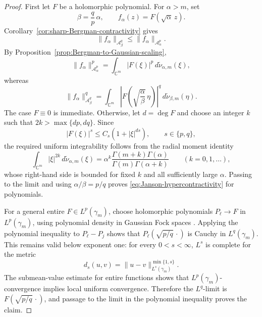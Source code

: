 \documentclass[11pt,reqno]{amsart}
\numberwithin{equation}{section}
\theoremstyle{definition}
\theoremstyle{remark}
\begin{document}
\begin{proof}
First let \(F\) be a holomorphic polynomial.  For \(\alpha>m\), set
\[
 \beta=\frac{q}p\,\alpha,
 \qquad
 f_\alpha(z)=F(\sqrt{\alpha}\,z).
\]
Corollary~\ref{cor:sharp-Bergman-contractivity} gives
\[
 \|f_\alpha\|_{\mathcal A^q_\beta}
 \le
 \|f_\alpha\|_{\mathcal A^p_\alpha}.
\]
By Proposition~\ref{prop:Bergman-to-Gaussian-scaling},
\[
 \|f_\alpha\|_{\mathcal A^p_\alpha}^p
 =
 \int_{\mathbb C^m}|F(\xi)|^p
 \,d\widetilde\nu_{\alpha,m}(\xi),
\]
whereas
\[
 \|f_\alpha\|_{\mathcal A^q_\beta}^q
 =
 \int_{\mathbb C^m}
 \left|F\!\left(\sqrt{\frac{\alpha}{\beta}}\,\eta\right)\right|^q
 \,d\widetilde\nu_{\beta,m}(\eta).
\]
The case \(F\equiv0\) is immediate. Otherwise, let \(d=\deg F\)
and choose an integer \(k\) such that
\(2k>\max\{dp,dq\}\).  Since
\[
 |F(\xi)|^s\le C_s(1+|\xi|^{ds}),
 \qquad s\in\{p,q\},
\]
the required uniform integrability follows from the radial moment identity
\[
 \int_{\mathbb C^m}|\xi|^{2k}\,
 d\widetilde\nu_{\alpha,m}(\xi)
 =
 \alpha^k
 \frac{\Gamma(m+k)\Gamma(\alpha)}{\Gamma(m)\Gamma(\alpha+k)}
 \qquad(k=0,1,\ldots),
\]
whose right-hand side is bounded for fixed \(k\) and all sufficiently large
\(\alpha\).  Passing to the limit and using \(\alpha/\beta=p/q\) proves
\eqref{eq:Janson-hypercontractivity} for polynomials.

For a general entire \(F\in L^p(\gamma_m)\), choose holomorphic polynomials
\(P_\ell\to F\) in \(L^p(\gamma_m)\), using polynomial density in Gaussian
Fock spaces \cite[Chapter~2]{ZhuFock2012}.  Applying the polynomial
inequality to \(P_\ell-P_j\) shows that
\(P_\ell(\sqrt{p/q}\,\cdot)\) is Cauchy in \(L^q(\gamma_m)\).  This remains
valid below exponent one: for every \(0<s<\infty\), \(L^s\) is complete for
the metric
\[
 d_s(u,v)=\|u-v\|_{L^s(\gamma_m)}^{\min\{1,s\}}.
\]
The submean-value estimate for entire functions shows that
\(L^p(\gamma_m)\)-convergence implies local uniform convergence.  Therefore
the \(L^q\)-limit is \(F(\sqrt{p/q}\,\cdot)\), and passage to the limit in
the polynomial inequality proves the claim.
\end{proof}
\end{document}
